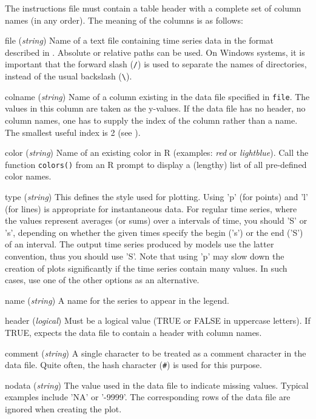 The instructions file must contain a table header with a complete set of column names (in any order). The meaning of the columns is as follows:
\begin{columndef}
  \item [file] (\textit{string}) Name of a text file containing time series data in the format described in . Absolute or relative paths can be used. On Windows systems, it is important that the forward slash (\verb!/!) is used to separate the names of directories, instead of the usual backslash (\verb!\!).
  \item [colname] (\textit{string}) Name of a column existing in the data file specified in \texttt{file}. The values in this column are taken as the y-values. If the data file has no header, \ie{} no column names, one has to supply the index of the column rather than a name. The smallest useful index is 2 (see ).
  \item [color] (\textit{string}) Name of an existing color in R (examples: \emph{red} or \emph{lightblue}). Call the function \texttt{colors()} from an R prompt to display a (lengthy) list of all pre-defined color names.
  \item [type] (\textit{string}) This defines the style used for plotting. Using 'p' (for points) and 'l' (for lines) is appropriate for instantaneous data. For regular time series, where the values represent averages (or sums) over a intervals of time, you should 'S' or 's', depending on whether the given times specify the begin ('s') or the end ('S') of an interval. The output time series produced by  models use the latter convention, thus you should use 'S'. Note that using 'p' may slow down the creation of plots significantly if the time series contain many values. In such cases, use one of the other options as an alternative.
  \item [name] (\textit{string}) A name for the series to appear in the legend.
  \item [header] (\textit{logical}) Must be a logical value (TRUE or FALSE in uppercase letters). If TRUE,  expects the data file to contain a header with column names.
  \item [comment] (\textit{string}) A single character to be treated as a comment character in the data file. Quite often, the hash character (\verb!#!) is used for this purpose.
  \item [nodata] (\textit{string}) The value used in the data file to indicate missing values. Typical examples include 'NA' or '-9999'. The corresponding rows of the data file are ignored when creating the plot.

\end{columndef}
